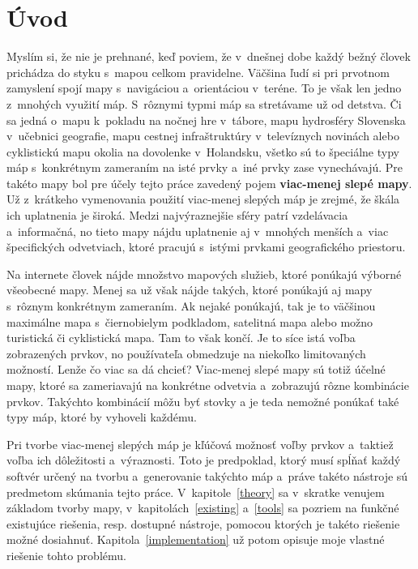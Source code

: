 \chapter{Úvod}
Myslím si, že nie je prehnané, keď poviem, že v~dnešnej dobe každý bežný človek prichádza do styku s~mapou celkom pravidelne. Väčšina ľudí si pri prvotnom zamyslení spojí mapy s~navigáciou a~orientáciou v~teréne. To je však len jedno z~mnohých využití máp. S~rôznymi typmi máp sa stretávame už od detstva. Či sa jedná o~mapu k~pokladu na nočnej hre v~tábore, mapu hydrosféry Slovenska v~učebnici geografie, mapu cestnej infraštruktúry v~televíznych novinách alebo cyklistickú mapu okolia na dovolenke v~Holandsku, všetko sú to špeciálne typy máp s~konkrétnym zameraním na isté prvky a~iné prvky zase vynechávajú. Pre takéto mapy bol pre účely tejto práce zavedený pojem \textbf{viac-menej slepé mapy}. Už z~krátkeho vymenovania použití viac-menej slepých máp je zrejmé, že škála ich uplatnenia je široká. Medzi najvýraznejšie sféry patrí vzdelávacia a~informačná, no tieto mapy nájdu uplatnenie aj v~mnohých menších a~viac špecifických odvetviach, ktoré pracujú s~istými prvkami geografického priestoru.

Na internete človek nájde množstvo mapových služieb, ktoré ponúkajú výborné všeobecné mapy. Menej sa už však nájde takých, ktoré ponúkajú aj mapy s~rôznym konkrétnym zameraním. Ak nejaké ponúkajú, tak je to väčšinou maximálne mapa s~čiernobielym podkladom, satelitná mapa alebo možno turistická či cyklistická mapa. Tam to však končí. Je to síce istá voľba zobrazených prvkov, no používateľa obmedzuje na niekoľko limitovaných možností. Lenže čo viac sa dá chcieť? Viac-menej slepé mapy sú totiž účelné mapy, ktoré sa zameriavajú na konkrétne odvetvia a~zobrazujú rôzne kombinácie prvkov. Takýchto kombinácií môžu byť stovky a je teda nemožné ponúkať také typy máp, ktoré by vyhoveli každému. 

Pri tvorbe viac-menej slepých máp je kľúčová možnosť voľby prvkov a~taktiež voľba ich dôležitosti a~výraznosti. Toto je predpoklad, ktorý musí spĺňať každý softvér určený na tvorbu a~generovanie takýchto máp a~práve takéto nástroje sú predmetom skúmania tejto práce. V~kapitole~\ref{theory} sa v~skratke venujem základom tvorby mapy, v~kapitolách~\ref{existing} a~\ref{tools} sa pozriem na funkčné existujúce riešenia, resp. dostupné nástroje, pomocou ktorých je takéto riešenie možné dosiahnuť. Kapitola~\ref{implementation} už potom opisuje moje vlastné riešenie tohto problému. 

